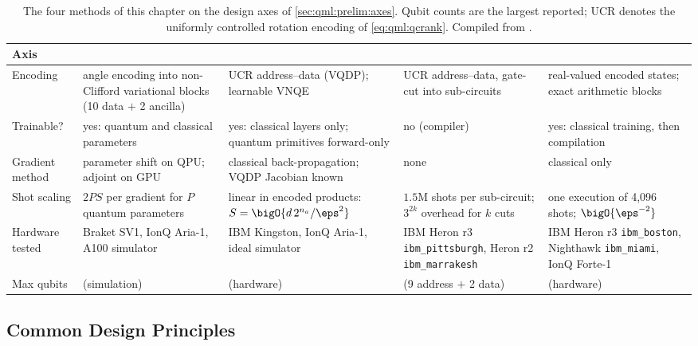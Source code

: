 \begin{table}[htbp]
\caption{The four methods of this chapter on the design axes of \cref{sec:qml:prelim:axes}. Qubit counts are the largest reported; UCR denotes the uniformly controlled rotation encoding of \cref{eq:qml:qcrank}. Compiled from \cite{guo2025qpie,guo2025vqt,guo2025shardq,guo2026nnqa}.}\label{tab:qml:synthesis}
\centering
\footnotesize
\setlength{\tabcolsep}{4pt}
\begin{tabular}{@{}>{\raggedright\arraybackslash}p{1.9cm}>{\raggedright\arraybackslash}p{2.9cm}>{\raggedright\arraybackslash}p{2.9cm}>{\raggedright\arraybackslash}p{2.9cm}>{\raggedright\arraybackslash}p{2.9cm}@{}}
\toprule
Axis & \qpie{} & \vqt{} & \shardq{} & \nnqa{} \\
\midrule
Encoding & angle encoding into non-Clifford variational blocks (10 data $+$ 2 ancilla) & UCR address--data (VQDP); learnable VNQE & UCR address--data, gate-cut into sub-circuits & real-valued encoded states; exact arithmetic blocks \\
\addlinespace
Trainable? & yes: quantum and classical parameters & yes: classical layers only; quantum primitives forward-only & no (compiler) & yes: classical training, then compilation \\
\addlinespace
Gradient method & parameter shift on QPU; adjoint on GPU & classical back-propagation; VQDP Jacobian known & none & classical only \\
\addlinespace
Shot scaling & $2PS$ per gradient for $P$ quantum parameters & linear in encoded products: $S=\bigO{d\,2^{n_a}/\eps^2}$ & $1.5$M shots per sub-circuit; $3^{2k}$ overhead for $k$ cuts & one execution of 4,096 shots; $\bigO{\eps^{-2}}$ \\
\addlinespace
Hardware tested & Braket SV1, IonQ Aria-1, A100 simulator & IBM Kingston, IonQ Aria-1, ideal simulator & IBM Heron r3 \texttt{ibm\_pittsburgh}, Heron r2 \texttt{ibm\_marrakesh} & IBM Heron r3 \texttt{ibm\_boston}, Nighthawk \texttt{ibm\_miami}, IonQ Forte-1 \\
\addlinespace
Max qubits & 28 (simulation) & 9 (hardware) & 11 (9 address $+$ 2 data) & 36 (hardware) \\
\bottomrule
\end{tabular}
\end{table}

\subsection{Common Design Principles}\label{sec:qml:synthesis:principles}


